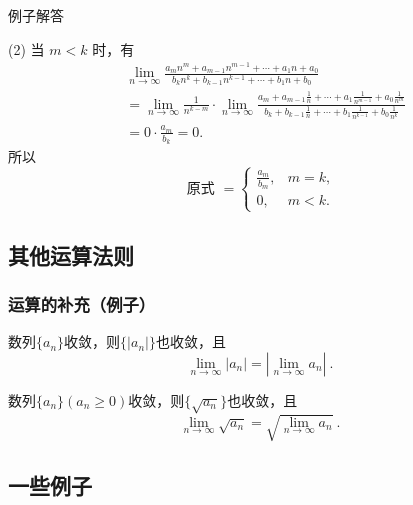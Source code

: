 \documentclass[mathserif]{beamer}
\begin{document}
\begin{frame}{例子解答}%
	\begin{jie}
		\suojin (2) 当 $m<k$ 时，有  
		$$
		\begin{aligned}
			& \lim _{n \rightarrow \infty} \frac{a_m n^m+a_{m-1} n^{m-1}+\cdots+a_1 n+a_0}{b_k n^k+b_{k-1} n^{k-1}+\cdots+b_1 n+b_0} \\
			& =\lim _{n \rightarrow \infty} \frac{1}{n^{k-m}} \cdot \lim _{n \rightarrow \infty} \frac{a_m+a_{m-1} \frac{1}{n}+\cdots+a_1 \frac{1}{n^{m-1}}+a_0 \frac{1}{n^m}}{b_k+b_{k-1} \frac{1}{n}+\cdots+b_1 \frac{1}{n^{k-1}}+b_0 \frac{1}{n^k}} \\
			& =0 \cdot \frac{a_m}{b_k}=0 .
		\end{aligned}
		$$
		\suojin 所以
		$$
		\text { 原式 }=\left\{
			\begin{aligned}
				\frac{a_m}{b_m}, & m=k, \\
				0, & m<k.
			\end{aligned}
		\right.
		$$  
		\end{jie}
	\end{frame}






\subsection{其他运算法则}
\begin{frame}[label=jsbuchong]
\frametitle{运算的补充（例子）}
\begin{prop}
\suojin 数列$\{a_n\}$收敛，则$\{|a_n|\}$也收敛，且
$$\lim_{n\rightarrow\infty}|a_n|=|\lim_{n\rightarrow\infty}a_n|\ .$$
\end{prop}

\hfill\hyperlink{jdzjszm<1>}{}
\jiange
  
\begin{prop}
\suojin 数列$\{a_n\}(a_n\geqslant 0)$收敛，则$\{\sqrt{a_n}\}$也收敛，且
$$\lim_{n\rightarrow\infty}\sqrt{a_n}=\sqrt{\lim_{n\rightarrow\infty}a_n}\ .$$
\end{prop}

 \hfill\hyperlink{kgjszm<1>}{}
\end{frame}




\subsection*{一些例子}
\end{document}
